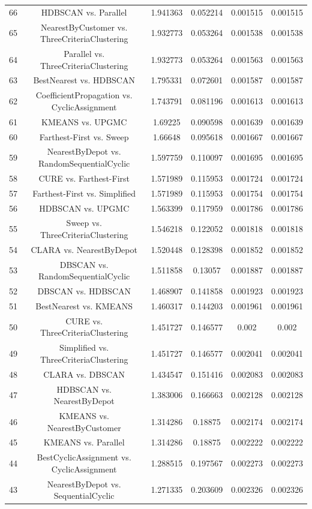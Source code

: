 \documentclass[a4paper,10pt]{article}
\begin{document}
\begin{landscape}
\begin{table}[!htp]
\begin{tabular}{cccccc}
66&HDBSCAN vs. Parallel&1.941363&0.052214&0.001515&0.001515\\
65&NearestByCustomer vs. ThreeCriteriaClustering&1.932773&0.053264&0.001538&0.001538\\
64&Parallel vs. ThreeCriteriaClustering&1.932773&0.053264&0.001563&0.001563\\
63&BestNearest vs. HDBSCAN&1.795331&0.072601&0.001587&0.001587\\
62&CoefficientPropagation vs. CyclicAssignment&1.743791&0.081196&0.001613&0.001613\\
61&KMEANS vs. UPGMC&1.69225&0.090598&0.001639&0.001639\\
60&Farthest-First vs. Sweep&1.66648&0.095618&0.001667&0.001667\\
59&NearestByDepot vs. RandomSequentialCyclic&1.597759&0.110097&0.001695&0.001695\\
58&CURE vs. Farthest-First&1.571989&0.115953&0.001724&0.001724\\
57&Farthest-First vs. Simplified&1.571989&0.115953&0.001754&0.001754\\
56&HDBSCAN vs. UPGMC&1.563399&0.117959&0.001786&0.001786\\
55&Sweep vs. ThreeCriteriaClustering&1.546218&0.122052&0.001818&0.001818\\
54&CLARA vs. NearestByDepot&1.520448&0.128398&0.001852&0.001852\\
53&DBSCAN vs. RandomSequentialCyclic&1.511858&0.13057&0.001887&0.001887\\
52&DBSCAN vs. HDBSCAN&1.468907&0.141858&0.001923&0.001923\\
51&BestNearest vs. KMEANS&1.460317&0.144203&0.001961&0.001961\\
50&CURE vs. ThreeCriteriaClustering&1.451727&0.146577&0.002&0.002\\
49&Simplified vs. ThreeCriteriaClustering&1.451727&0.146577&0.002041&0.002041\\
48&CLARA vs. DBSCAN&1.434547&0.151416&0.002083&0.002083\\
47&HDBSCAN vs. NearestByDepot&1.383006&0.166663&0.002128&0.002128\\
46&KMEANS vs. NearestByCustomer&1.314286&0.18875&0.002174&0.002174\\
45&KMEANS vs. Parallel&1.314286&0.18875&0.002222&0.002222\\
44&BestCyclicAssignment vs. CyclicAssignment&1.288515&0.197567&0.002273&0.002273\\
43&NearestByDepot vs. SequentialCyclic&1.271335&0.203609&0.002326&0.002326\\

\end{tabular}
\end{table}
\end{landscape}
\end{document}
